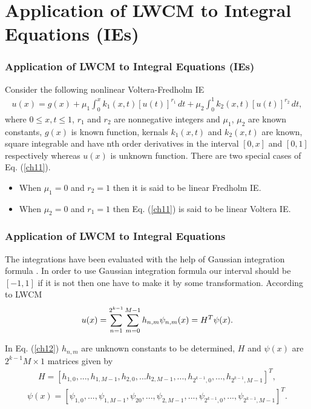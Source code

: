\documentclass{beamer}
\begin{document}
\section{Application of LWCM to Integral Equations (IEs)}
\begin{frame}\frametitle{Application of LWCM to Integral Equations (IEs)}
	\justifying
Consider the following nonlinear Voltera-Fredholm IE \cite{yousaf}
\tiny
\begin{eqnarray}\label{ch11}
u(x) = g(x) +
\mu_{1}\int^x_0 k_{1}(x,t)[u(t)]^{r_{1}}\,dt + \mu_{2}\int^1_0 k_{2}(x,t)[u(t)]^{r_{2}}\,dt,
\end{eqnarray}
\normalsize
where $0\leq x,t \leq 1$, $r_{1}$ and $r_{2}$ are nonnegative integers and $\mu_{1}$, $\mu_{2}$ are known constants, $g(x)$ is known function, kernals $k_{1}(x,t)$ and $k_{2}(x,t)$ are known, square integrable and have nth order derivatives in the interval $[0,x]$ and $[0,1]$ respectively whereas $u(x)$ is unknown function. There are two special cases of Eq. (\ref{ch11}).
\begin{itemize}
	\item When $\mu_{1}=0$ and $r_{2}=1$ then it is said to be linear Fredholm IE.
    \item When $\mu_{2}=0$ and $r_{1}=1$ then Eq. (\ref{ch11}) is said to be linear Voltera IE.
\end{itemize}
\end{frame}
\begin{frame}\frametitle{Application of LWCM to Integral Equations}
	\justifying
	The integrations have been evaluated with the help of Gaussian integration formula \cite{Imran}. In order to use Gaussian integration formula our interval should be $[-1,1]$ if it is not then one have to make it by some transformation.
According to LWCM
\begin{eqnarray}\label{ch12}
\tiny
u(x)=\sum_{n=1}^{2^{k-1}}\sum_{m=0}^{M-1}h_{n,m}\psi_{n,m}(x)=H^{T}\psi(x).
\end{eqnarray}

In Eq. (\ref{ch12}) $h_{n,m}$ are unknown constants to be determined, $H$ and $\psi(x)$ are $2^{k-1}M\times1$ matrices given by
\begin{eqnarray}\label{13}
H=[h_{1,0},...,h_{1,M-1},h_{2,0},...h_{2,M-1},...,h_{2^{k-1},0},...,h_{2^{k-1},M-1}]^{T},\nonumber
\end{eqnarray}
\small
\begin{eqnarray}\label{14}
\psi(x)=[\psi_{1,0},...,\psi_{1,M-1},\psi_{20},...,\psi_{2,M-1},...,\psi_{2^{k-1},0},...,\psi_{2^{k-1},M-1}]^{T}.\nonumber
\end{eqnarray}
\small
\normalsize
\end{frame}
\end{document}
